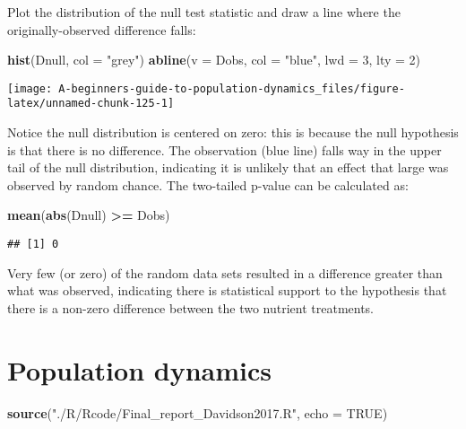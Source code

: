\documentclass[]{book}
\newenvironment{Shaded}{\begin{snugshade}}{\end{snugshade}}
\newcommand{\DataTypeTok}[1]{\textcolor[rgb]{0.13,0.29,0.53}{#1}}
\newcommand{\DecValTok}[1]{\textcolor[rgb]{0.00,0.00,0.81}{#1}}
\newcommand{\KeywordTok}[1]{\textcolor[rgb]{0.13,0.29,0.53}{\textbf{#1}}}
\newcommand{\NormalTok}[1]{#1}
\newcommand{\OperatorTok}[1]{\textcolor[rgb]{0.81,0.36,0.00}{\textbf{#1}}}
\newcommand{\OtherTok}[1]{\textcolor[rgb]{0.56,0.35,0.01}{#1}}
\newcommand{\StringTok}[1]{\textcolor[rgb]{0.31,0.60,0.02}{#1}}
\begin{document}
Plot the distribution of the null test statistic and draw a line where the originally-observed difference falls:

\begin{Shaded}
\begin{Highlighting}[]
\KeywordTok{hist}\NormalTok{(Dnull, }\DataTypeTok{col =} \StringTok{"grey"}\NormalTok{)}
\KeywordTok{abline}\NormalTok{(}\DataTypeTok{v =}\NormalTok{ Dobs, }\DataTypeTok{col =} \StringTok{"blue"}\NormalTok{, }\DataTypeTok{lwd =} \DecValTok{3}\NormalTok{, }\DataTypeTok{lty =} \DecValTok{2}\NormalTok{)}
\end{Highlighting}
\end{Shaded}

\begin{center}\texttt{[image: A-beginners-guide-to-population-dynamics\_files/figure-latex/unnamed-chunk-125-1]} \end{center}

Notice the null distribution is centered on zero: this is because the null hypothesis is that there is no difference. The observation (blue line) falls way in the upper tail of the null distribution, indicating it is unlikely that an effect that large was observed by random chance. The two-tailed p-value can be calculated as:

\begin{Shaded}
\begin{Highlighting}[]
\KeywordTok{mean}\NormalTok{(}\KeywordTok{abs}\NormalTok{(Dnull) }\OperatorTok{>=}\StringTok{ }\NormalTok{Dobs)}
\end{Highlighting}
\end{Shaded}

\begin{verbatim}
## [1] 0
\end{verbatim}

Very few (or zero) of the random data sets resulted in a difference greater than what was observed, indicating there is statistical support to the hypothesis that there is a non-zero difference between the two nutrient treatments.

\hypertarget{population-dynamics-1}{%
\section{Population dynamics}\label{population-dynamics-1}}

\begin{Shaded}
\begin{Highlighting}[]
\KeywordTok{source}\NormalTok{(}\StringTok{"./R/Rcode/Final_report_Davidson2017.R"}\NormalTok{, }\DataTypeTok{echo =} \OtherTok{TRUE}\NormalTok{)}
\end{Highlighting}
\end{Shaded}
\end{document}
